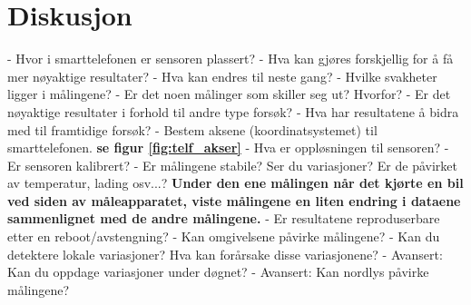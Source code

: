 \section{Diskusjon}

- Hvor i smarttelefonen er sensoren plassert? \newline 
- Hva kan gjøres forskjellig for å få mer nøyaktige resultater? - Hva kan endres til neste gang? \newline
- Hvilke svakheter ligger i målingene? \newline
- Er det noen målinger som skiller seg ut? Hvorfor? \newline
- Er det nøyaktige resultater i forhold til andre type forsøk? \newline 
- Hva har resultatene å bidra med til framtidige forsøk? \newline                                    
- Bestem aksene (koordinatsystemet) til smarttelefonen. \textbf{se figur \ref{fig:telf_akser} }\newline 
- Hva er oppløsningen til sensoren? \newline 
- Er sensoren kalibrert? \newline
- Er målingene stabile? Ser du variasjoner? Er de påvirket av temperatur, lading
osv...? \textbf{Under den ene målingen når det kjørte en bil ved siden av måleapparatet, viste målingene en liten endring i dataene sammenlignet med de andre målingene. }\newline
- Er resultatene reproduserbare etter en reboot/avstengning? \newline
- Kan omgivelsene påvirke målingene? \newline                      
- Kan du detektere lokale variasjoner? Hva kan forårsake disse variasjonene?  \newline
- Avansert: Kan du oppdage variasjoner under døgnet? \newline
- Avansert: Kan nordlys påvirke målingene? \newline 

